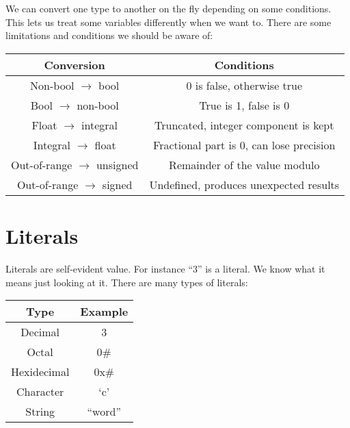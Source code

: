 \documentclass[12pt, a4paper]{report}
\begin{document}
\noindent We can convert one type to another on the fly depending on some conditions. This lets us treat some variables differently when we want to. There are some limitations and conditions we should be aware of:
\begin{center}
  \begin{tabular}{ |c|c| }
    \hline
    \textbf{Conversion} & \textbf{Conditions} \\
    \hline
    Non-bool $\rightarrow$ bool & 0 is false, otherwise true \\
    \hline
    Bool $\rightarrow$ non-bool & True is 1, false is 0 \\
    \hline
    Float $\rightarrow$ integral & Truncated, integer component is kept \\
    \hline
    Integral $\rightarrow$ float & Fractional part is 0, can lose precision \\
    \hline
    Out-of-range $\rightarrow$ unsigned & Remainder of the value modulo \\
    \hline
    Out-of-range $\rightarrow$ signed & Undefined, produces unexpected results \\
    \hline
  \end{tabular}
\end{center}
\section{Literals}
Literals are self-evident value. For instance ``3'' is a literal. We know what it means just looking at it. There are many types of literals:
\begin{center}
  \begin{tabular}{ |c|c| }
    \hline
    \textbf{Type} & \textbf{Example} \\
    \hline
    Decimal & 3 \\
    \hline
    Octal & 0\# \\
    \hline
    Hexidecimal & 0x\# \\
    \hline
    Character & `c' \\
    \hline
    String & ``word'' \\
    \hline
  \end{tabular}
\end{center}
\end{document}
